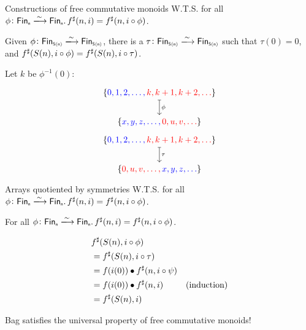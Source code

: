 \documentclass[9pt]{beamer}
\begin{document}
\begin{frame}[fragile]{Constructions of free commutative monoids}
    W.T.S. for all $\phi\colon \Fin[n]\xto{\sim}\Fin[n]. \, \ext{f}(n, i) = \ext{f}(n, i \circ \phi)$.

    \begin{tblock}
    Given $\phi\colon \Fin[S(n)]\xto{\sim}\Fin[S(n)]$, there is a $\tau\colon \Fin[S(n)]\xto{\sim}\Fin[S(n)]$
    such that $\tau(0) = 0$, and ${f}^{\sharp}(S(n), i \circ \phi) = {f}^{\sharp}(S(n), i \circ \tau)$.
    \end{tblock}

    Let $k$ be $\phi^{-1}(0)$:

    \[\begin{tikzcd}[ampersand replacement=\&,cramped]
    	{\{\color{blue}0, 1, 2, \dots, \color{red}k, k+1, k+2, \dots \color{black}\}} \\
    	{ \{\color{blue}x, y, z, \dots, \color{red}0, u, v, \dots \color{black}\}}
        \arrow["\phi", maps to, from=1-1, to=2-1]
    \end{tikzcd}\]

    \[\begin{tikzcd}[ampersand replacement=\&,cramped]
    	{\{\color{blue}0, 1, 2, \dots, \color{red}k, k+1, k+2, \dots \color{black}\}} \\
    	{ \{\color{red}0, u, v, \dots, \color{blue}x, y, z, \dots \color{black}\}}
        \arrow["\tau", maps to, from=1-1, to=2-1]
    \end{tikzcd}\]
    
    
\end{frame}

\begin{frame}[fragile]{Arrays quotiented by symmetries}
    W.T.S. for all $\phi\colon \Fin[n]\xto{\sim}\Fin[n]. \, \ext{f}(n, i) = \ext{f}(n, i \circ \phi)$.

    \begin{tblock}
    For all $\phi\colon \Fin[n]\xto{\sim}\Fin[n]. \, \ext{f}(n, i) = \ext{f}(n, i \circ \phi)$.
    \end{tblock}

    \begin{align*}
        & {f}^{\sharp}(S(n), i \circ \phi) \\
        & = {f}^{\sharp}(S(n), i \circ \tau) \\
        & = f(i(0)) \bullet {f}^{\sharp}(n, i \circ \psi) \\
        & = f(i(0)) \bullet {f}^{\sharp}(n, i) & \text{(induction)} \\
        & = {f}^{\sharp}(S(n), i)
    \end{align*}

    Bag satisfies the universal property of \alert{free commutative monoids}!
    
\end{frame}
\end{document}
